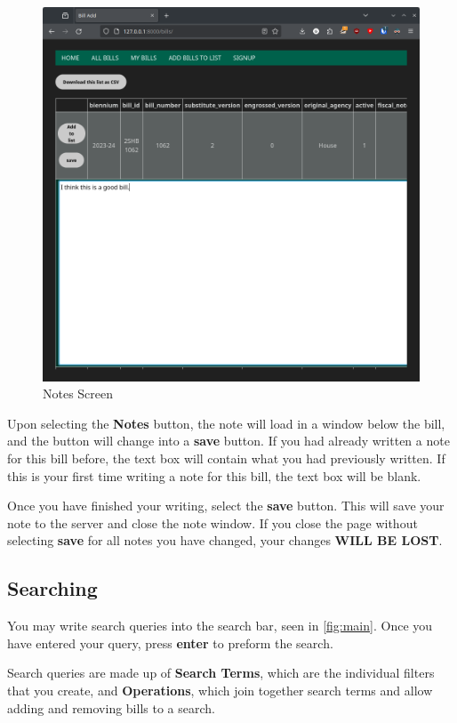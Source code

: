 \documentclass{article}
\begin{document}
\begin{figure}[H]
\includegraphics[width=\textwidth]{notes.png}
\caption{Notes Screen}
\label{fig:notes}
\end{figure}

Upon selecting the \textbf{Notes} button, the note will load in a window below the bill, and the button will change into a \textbf{save} button. If you had already written a note for this bill before, the text box will contain what you had previously written. If this is your first time writing a note for this bill, the text box will be blank.

Once you have finished your writing, select the \textbf{save} button. This will save your note to the server and close the note window. If you close the page without selecting \textbf{save} for all notes you have changed, your changes \textbf{WILL BE LOST}.

\subsection{Searching}

You may write search queries into the search bar, seen in \autoref{fig:main}. Once you have entered your query, press \textbf{enter} to preform the search.

Search queries are made up of \textbf{Search Terms}, which are the individual filters that you create, and \textbf{Operations}, which join together search terms and allow adding and removing bills to a search.
\end{document}
